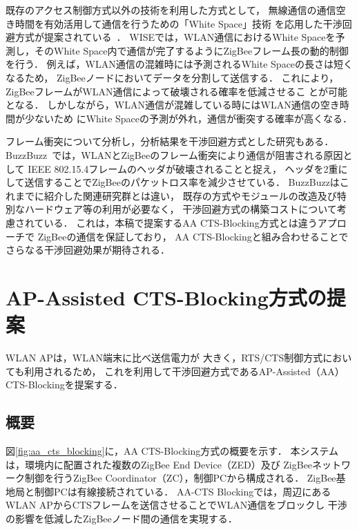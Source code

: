 \documentclass[12pt]{jreport}
\begin{document}
既存のアクセス制御方式以外の技術を利用した方式として，
無線通信の通信空き時間を有効活用して通信を行うための「White Space」技術
を応用した干渉回避方式が提案されている~\cite{huang10:beyond_coexist}．
WISEでは，WLAN通信におけるWhite Spaceを予測し，そのWhite
Space内で通信が完了するようにZigBeeフレーム長の動的制御を行う．
例えば，WLAN通信の混雑時には予測されるWhite Spaceの長さは短くなるため，
ZigBeeノードにおいてデータを分割して送信する．
これにより，ZigBeeフレームがWLAN通信によって破壊される確率を低減させるこ
とが可能となる．
しかしながら，WLAN通信が混雑している時にはWLAN通信の空き時間が少ないため
にWhite Spaceの予測が外れ，通信が衝突する確率が高くなる．

フレーム衝突について分析し，分析結果を干渉回避方式とした研究もある．
BuzzBuzz~\cite{liang10:wifi_zigbee_survive}では，WLANとZigBeeのフレーム衝突により通信が阻害される原因として
IEEE 802.15.4フレームのヘッダが破壊されることと捉え，
ヘッダを2重にして送信することでZigBeeのパケットロス率を減少させている．
BuzzBuzzはこれまでに紹介した関連研究群とは違い，
既存の方式やモジュールの改造及び特別なハードウェア等の利用が必要なく，
干渉回避方式の構築コストについて考慮されている．
これは，本稿で提案するAA CTS-Blocking方式とは違うアプローチで
ZigBeeの通信を保証しており，
AA CTS-Blockingと組み合わせることでさらなる干渉回避効果が期待される．


\chapter{AP-Assisted CTS-Blocking方式の提案}
\label{aa_cts}

WLAN APは，WLAN端末に比べ送信電力が
大きく，RTS/CTS制御方式においても利用されるため，
これを利用して干渉回避方式であるAP-Assisted（AA）
CTS-Blockingを提案する．

\section{概要}
\label{sec:outline}

図\ref{fig:aa_cts_blocking}に，AA CTS-Blocking方式の概要を示す．
本システムは，環境内に配置された複数のZigBee End Device（ZED）及び
ZigBeeネットワーク制御を行うZigBee Coordinator（ZC），制御PCから構成される．
ZigBee基地局と制御PCは有線接続されている．
AA-CTS Blockingでは，周辺にあるWLAN APからCTSフレームを送信させることでWLAN通信をブロックし
干渉の影響を低減したZigBeeノード間の通信を実現する．
\end{document}
